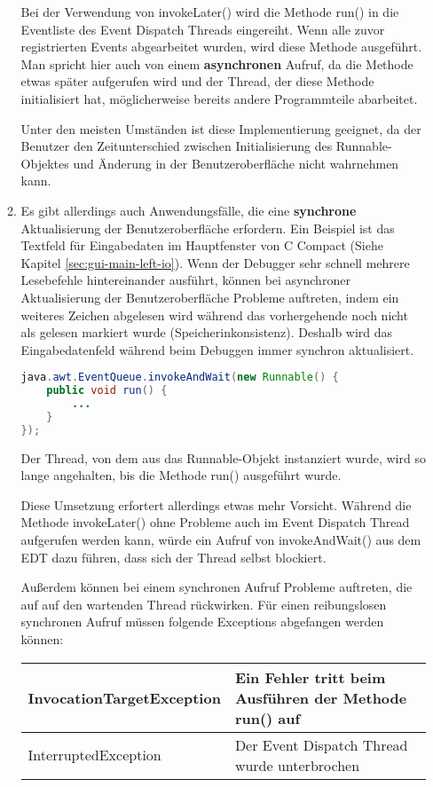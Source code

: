 \begin{enumerate}
\begin{enumerate}
	Bei der Verwendung von invokeLater() wird die Methode run() in die Eventliste des Event Dispatch Threads eingereiht. Wenn alle zuvor registrierten Events abgearbeitet wurden, wird diese Methode ausgeführt. Man spricht hier auch von einem \textbf{asynchronen} Aufruf, da die Methode etwas später aufgerufen wird und der Thread, der diese Methode initialisiert hat, möglicherweise bereits andere Programmteile abarbeitet.
	
	Unter den meisten Umständen ist diese Implementierung geeignet, da der Benutzer den Zeitunterschied zwischen Initialisierung des Runnable-Objektes und Änderung in der Benutzeroberfläche nicht wahrnehmen kann. 
	
\item Es gibt allerdings auch Anwendungsfälle, die eine \textbf{synchrone} Aktualisierung der Benutzeroberfläche erfordern. Ein Beispiel ist das Textfeld für Eingabedaten im Hauptfenster von C Compact (Siehe Kapitel \ref{sec:gui-main-left-io}). Wenn der Debugger sehr schnell mehrere Lesebefehle hintereinander ausführt, können bei asynchroner Aktualisierung der Benutzeroberfläche Probleme auftreten, indem ein weiteres Zeichen abgelesen wird während das vorhergehende noch nicht als gelesen markiert wurde (Speicherinkonsistenz). Deshalb wird das Eingabedatenfeld während beim Debuggen immer synchron aktualisiert.
\begin{lstlisting}[language=JAVA]
java.awt.EventQueue.invokeAndWait(new Runnable() {
	public void run() {
		...
	}
});
\end{lstlisting}
	Der Thread, von dem aus das Runnable-Objekt instanziert wurde, wird so lange angehalten, bis die Methode run() ausgeführt wurde.

	Diese Umsetzung erfortert allerdings etwas mehr Vorsicht. Während die Methode invokeLater() ohne Probleme auch im Event Dispatch Thread aufgerufen werden kann, würde ein Aufruf von invokeAndWait() aus dem EDT dazu führen, dass sich der Thread selbst blockiert.
	
	Außerdem können bei einem synchronen Aufruf Probleme auftreten, die auf auf den wartenden Thread rückwirken. Für einen reibungslosen synchronen Aufruf müssen folgende Exceptions abgefangen werden können:

\def\arraystretch{2.1}
\begin{tabular}{|l|l|}
	\hline
	InvocationTargetException & \parbox{7cm}{Ein Fehler tritt beim Ausführen der Methode run() auf}\\
	\hline
	InterruptedException & \parbox{7cm}{Der Event Dispatch Thread wurde unterbrochen}\\
	\hline
\end{tabular}
\end{enumerate}
\end{enumerate}


